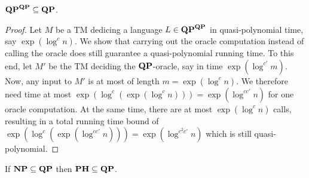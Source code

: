 \documentclass[12pt]{article}
\theoremstyle{definition}
\begin{document}
\newpage

\begin{lemma}
	\label{lem:qp-collapse}
	$\mathbf{QP}^{\mathbf{QP}} \subseteq \mathbf{QP}$.
\end{lemma}

\begin{proof}
  Let $M$ be a TM dedicing a language $L \in \mathbf{QP}^{\mathbf{QP}}$ in
  quasi-polynomial time, say $\exp(\log^c n)$.
  We show that carrying out the oracle computation instead of calling the
  oracle does still guarantee a quasi-polynomial running time. To this end,
  let $M'$ be the TM deciding the $\mathbf{QP}$-oracle, say in time
  $\exp(\log^{c'} m)$.
  Now, any input to $M'$ is at most of length $m = \exp(\log^c n)$. We
  therefore need time at most
  $\exp(\log^c (\exp(\log^c n))) = \exp(\log^{cc'} n)$
  for one oracle computation. At the same time, there are at most
  $\exp(\log^c n)$ calls, resulting in a total running time bound of
  $\exp(\log^c (\exp(\log^{cc'} n))) = \exp(\log^{c^2 c'} n)$
  which is still quasi-polynomial.
\end{proof}

%   
%   
%   
%   
%   
%   

\begin{corollary}
  \label{lem:ph-sub-qp}
  If $\mathbf{NP} \subseteq \mathbf{QP}$ then
  $\mathbf{PH} \subseteq \mathbf{QP}$.
\end{corollary}
\end{document}
